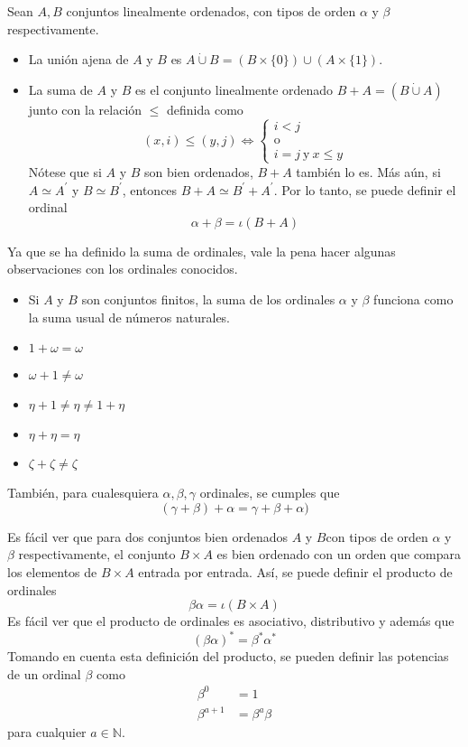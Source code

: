 \begin{definition}
  Sean $A,B$ conjuntos linealmente ordenados, con tipos de orden $\alpha$ y $\beta$ respectivamente.
  \begin{itemize}
      \item La unión ajena de $A$ y $B$ es $A\dot\cup B=(B\times\{0\})\cup(A\times\{1\})$.
      \item La suma de $A$ y $B$ es el conjunto linealmente ordenado $B+A=(B\dot\cup A)$ junto con la relación $\leq$ definida como
      $$(x,i)\leq(y,j)\iff\begin{cases}
          i<j\\
          \text{o}\\
          i=j \ \text{y} \ x\leq y
      \end{cases}$$
      Nótese que si $A$ y $B$ son bien ordenados, $B+A$ también lo es. Más aún, si $A\simeq A^\prime$ y $B\simeq B^\prime$, entonces $B+A\simeq B^\prime+A^\prime$. Por lo tanto, se puede definir el ordinal
      $$\alpha+\beta=\iota(B+A)$$
  \end{itemize}
\end{definition}
Ya que se ha definido la suma de ordinales, vale la pena hacer algunas observaciones con los ordinales conocidos.
\begin{example}
    \leavevmode
   \begin{itemize}
       \item Si $A$ y $B$ son conjuntos finitos, la suma de los ordinales $\alpha$ y $\beta$ funciona como la suma usual de números naturales.
       \item $1+\omega=\omega$
       \item $\omega+1\neq\omega$
       \item $\eta+1\neq \eta \neq 1+\eta$
       \item $\eta+\eta=\eta$
       \item $\zeta+\zeta\neq\zeta$
   \end{itemize} 
   También, para cualesquiera $\alpha,\beta,\gamma$ ordinales, se cumples que 
   $$(\gamma+\beta)+\alpha=\gamma+\beta+\alpha)$$
\end{example}
\begin{definition}
  Es fácil ver que para dos conjuntos bien ordenados $A$ y $B$con tipos de orden $\alpha$ y $\beta$ respectivamente, el conjunto $B\times A$ es bien ordenado con un orden que compara los elementos de $B\times A$ entrada por entrada. Así, se puede definir el producto de ordinales
  $$\beta\alpha=\iota(B\times A)$$
  Es fácil ver que el producto de ordinales es asociativo, distributivo y además que 
  $$(\beta\alpha)^*=\beta^*\alpha^*$$
  Tomando en cuenta esta definición del producto, se pueden definir las potencias de un ordinal $\beta$ como
  \begin{align*}
      \beta^0&=1\\
      \beta^{a+1}&=\beta^{a}\beta
  \end{align*}
  para cualquier $a\in\mathbb{N}$.
\end{definition}
